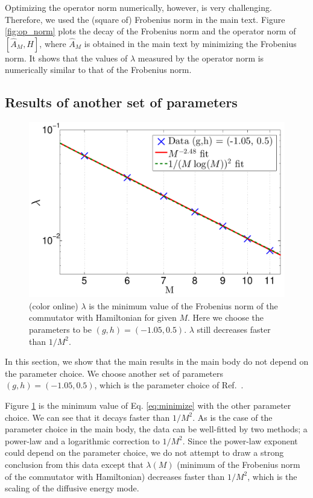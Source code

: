 \documentclass[twocolumn,superscriptaddress, prb]{revtex4-1}
\begin{document}
Optimizing the operator norm numerically, however, is very challenging. Therefore, we used the (square of) Frobenius norm in the main text. 
Figure \ref{fig:op_norm} plots the decay of the Frobenius norm and the operator norm of $[\hat{A}_M,H]$, 
where $\hat{A}_M$ is obtained in the main text by minimizing the Frobenius norm. 
It shows that the values of $\lambda$ measured by the operator norm is numerically similar to that of the Frobenius norm.  


\subsection{Results of another set of parameters}
\begin{figure}
\includegraphics[width=1.0\linewidth]{semi_infinite_full_optimal_other_parameter.pdf}
\centering
\caption{(color online) $\lambda$ is the minimum value of the Frobenius norm of the commutator with Hamiltonian for given $M$.
Here we choose the parameters to be $(g,h) = (-1.05, 0.5)$. $\lambda$ still decreases faster than $1/M^2$. }
\label{fig:full_optimal_other}
\end{figure}
In this section, we show that the main results in the main body do not depend on the parameter choice.
We choose another set of parameters $(g,h) = (-1.05, 0.5)$, which is the parameter choice of Ref.~.

Figure \ref{fig:full_optimal_other} is the minimum value of Eq. \eqref{eq:minimize} with the other parameter choice.
We can see that it decays faster than $1/M^2$. As is the case of the parameter choice in the main body,
the data can be well-fitted by two methods; a power-law and a logarithmic correction to $1/M^2$.
Since the power-law exponent could depend on the parameter choice, we do not attempt to draw a strong conclusion from this data
except that $\lambda(M)$ (minimum of the Frobenius norm of the commutator with Hamiltonian) decreases faster than $1/M^2$,
which is the scaling of the diffusive energy mode.
\end{document}
